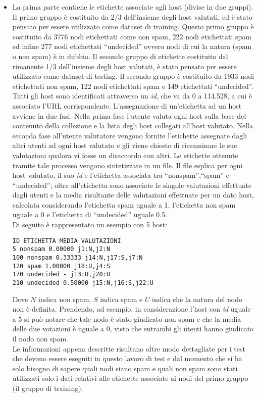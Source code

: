 \begin{itemize}
 \item La prima parte contiene le etichette associate agli host (divise in due gruppi). Il primo gruppo è costituito da 2/3 dell'insieme degli host valutati, ed è stato pensato per essere utilizzato come dataset di training. Questo primo gruppo è costituito da 3776 nodi etichettati come non spam, 222 nodi etichettati spam ed infine 277 nodi etichettati ``undecided'' ovvero nodi di cui la natura (spam o non spam) è in dubbio. Il secondo gruppo di etichette costituito dal rimanente 1/3 dell'insieme degli host valutati, è stato pensato per essere utilizzato come dataset di testing. Il secondo gruppo è costituito da 1933 nodi etichettati non spam, 122 nodi etichettati spam e 149 etichettati ``undecided''. \\ Tutti gli host sono identificati attraverso un \textit{id}, che va da 0 a 114.528, a cui è associato l'URL corrispondente.
 L'assegnazione di un'etichetta ad un host avviene in due fasi. Nella prima fase l'utente valuta ogni host sulla base del contenuto della collezione e la lista degli host collegati all'host valutato. Nella seconda fase all'utente valutatore vengono fornite l'etichette  assegnate dagli altri utenti ad ogni host valutato e gli viene chiesto di riesaminare le sue valutazioni qualora vi fosse un disaccordo con altri. Le etichette ottenute tramite tale processo vengono sintetizzate in un file. Il file esplica per ogni host valutato, il suo \textit{id}  e l'etichetta associata tra ``nonspam'',``spam'' e ``undecided''; oltre all'etichetta sono associate le singole valutazioni effettuate dagli utenti e la media risultante delle valutazioni effettuate per un dato host, calcolata considerando l'etichetta spam uguale a 1, l'etichetta non spam  uguale a 0 e l'etichetta di ``undecided'' uguale 0.5.\\
Di seguito è rappresentato un esempio con 5 host: 
 \begin{lstlisting}[frame=trbl,postbreak=\space, breakindent=5pt, breaklines]
ID ETICHETTA MEDIA VALUTAZIONI
5 nonspam 0.00000 j1:N,j2:N
100 nonspam 0.33333 j14:N,j17:S,j7:N
120 spam 1.00000 j18:U,j4:S
170 undecided - j13:U,j20:U
210 undecided 0.50000 j15:N,j16:S,j22:U
\end{lstlisting}
Dove \(N\) indica non spam, \(S\) indica spam e \(U\) indica che la natura del nodo non è definita. Prendendo, ad esempio, in considerazione l'host con \textit{id} uguale a 5 si può notare che tale nodo è stato giudicato non spam e che la media delle due votazioni è uguale a 0, visto che entrambi gli utenti hanno giudicato il nodo non spam.\\ 
Le informazioni appena descritte risultano oltre modo dettagliate per i test che devono essere eseguiti in questo lavoro di tesi e dal momento che si ha solo bisogno di sapere quali nodi siano spam e quali non spam sono stati utilizzati solo i dati relativi alle etichette associate ai nodi del primo gruppo (il gruppo di training).


\end{itemize}
